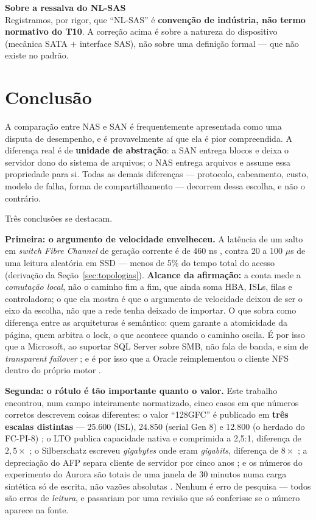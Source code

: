\documentclass[11pt,a4paper]{article}
\newcommand{\correcao}[2]{%
  \begin{center}\begin{minipage}{0.96\textwidth}
  \colorbox{fundo}{\begin{minipage}{\dimexpr\linewidth-2\fboxsep}
  \vspace{2pt}\textbf{\color{laranja}\small #1}\\[1pt]\footnotesize #2\vspace{3pt}
  \end{minipage}}\end{minipage}\end{center}}
\begin{document}
\correcao{Sobre a ressalva do NL-SAS}{%
Registramos, por rigor, que ``NL-SAS'' é \textbf{convenção de indústria, não termo normativo do
T10}. A correção acima é sobre a natureza do dispositivo (mecânica SATA $+$ interface SAS), não
sobre uma definição formal --- que não existe no padrão.}

\section{Conclusão}

A comparação entre NAS e SAN é frequentemente apresentada como uma disputa de desempenho, e é
provavelmente aí que ela é pior compreendida. A diferença real é de \textbf{unidade de abstração}:
a SAN entrega blocos e deixa o servidor dono do sistema de arquivos; o NAS entrega arquivos e
assume essa propriedade para si. Todas as demais diferenças --- protocolo, cabeamento, custo,
modelo de falha, forma de compartilhamento --- decorrem dessa escolha, e não o contrário.

Três conclusões se destacam.

\textbf{Primeira: o argumento de velocidade envelheceu.} A latência de um salto em
\textit{switch Fibre Channel} de geração corrente é de 460 ns \cite{brocadeg710}, contra 20 a 100
$\mu$s de uma leitura aleatória em SSD \cite{silberschatz2020} --- menos de 5\% do tempo total do
acesso (derivação da Seção~\ref{sec:topologias}). \textbf{Alcance da afirmação:} a conta mede a
\emph{comutação local}, não o caminho fim a fim, que ainda soma HBA, ISLs, filas e controladora;
o que ela mostra é que o argumento de velocidade deixou de ser o eixo da escolha, não que a rede
tenha deixado de importar. O que sobra como
diferença entre as arquiteturas é semântico: quem garante a atomicidade da página, quem arbitra o
lock, o que acontece quando o caminho oscila. É por isso que a Microsoft, ao suportar SQL
Server sobre SMB, não fala de banda, e sim de \textit{transparent failover} \cite{mssqlsmb}; e é por
isso que a Oracle reimplementou o cliente NFS dentro do próprio motor \cite{oracledn}.

\textbf{Segunda: o rótulo é tão importante quanto o valor.} Este trabalho encontrou, num campo
inteiramente normatizado, cinco casos em que números corretos descrevem coisas diferentes: o valor
``128GFC'' é publicado em \textbf{três escalas distintas} --- 25.600 (ISL), 24.850 (serial Gen 8) e
12.800 (o herdado do FC-PI-8) \cite{fciaroadmap,fcia128}; o LTO publica capacidade nativa e
comprimida a 2,5:1, diferença de $2{,}5\times$ \cite{lto10}; o Silberschatz escreveu
\textit{gigabytes} onde eram \textit{gigabits}, diferença de $8\times$ \cite{silberschatz2020}; a
depreciação do AFP separa cliente de servidor por cinco anos \cite{appleafp}; e os números do
experimento do Aurora são totais de uma janela de 30 minutos numa carga sintética só de escrita,
não vazões absolutas \cite{aurora2017}. Nenhum é erro de pesquisa --- todos são erros de
\emph{leitura}, e passariam por uma revisão que só conferisse se o número aparece na fonte.
\end{document}
